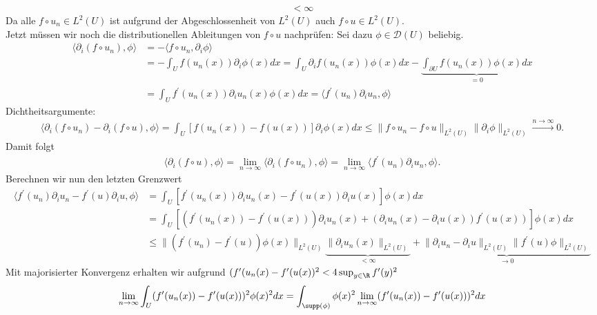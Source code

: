 \begin{solution}
\begin{align*}
  < \infty
\end{align*}
Da alle $f\circ u_n \in L^2(U)$ ist aufgrund der Abgeschlossenheit von $L^2(U)$
auch $f\circ u \in L^2(U)$. \\
Jetzt müssen wir noch die distributionellen Ableitungen von $f\circ u$ nachprüfen:
Sei dazu $\phi \in \mathcal{D}(U)$ beliebig.
\begin{align*}
  \langle \partial_i(f\circ u_n), \phi \rangle &= - \langle f\circ u_n, \partial_i \phi \rangle \\
  &= -\int_U f(u_n(x)) \partial_i\phi(x) dx = \int_U \partial_i f(u_n(x)) \phi(x) dx
  - \underbrace{\int_{\partial U} f(u_n(x))\phi(x) dx}_{=0} \\
  &= \int_U f^\prime(u_n(x)) \partial_i u_n(x) \phi(x) dx
  = \langle f^{\prime}(u_n)\partial_i u_n, \phi \rangle
\end{align*}
Dichtheitsargumente:
\begin{align*}
  \langle \partial_i(f\circ u_n) - \partial_i(f\circ u), \phi \rangle
  = \int_U[f(u_n(x)) - f(u(x))]\partial_i\phi(x) dx \leq
  \|f\circ u_n - f\circ u\|_{L^2(U)}\|\partial_i \phi\|_{L^2(U)} \xrightarrow{n \to \infty} 0.
\end{align*}
Damit folgt
\begin{align*}
  \langle \partial_i (f \circ u), \phi \rangle
  = \lim_{n \to \infty}\langle \partial_i (f \circ u_n), \phi \rangle
  = \lim_{n \to \infty}\langle f^{\prime}(u_n)\partial_i u_n, \phi \rangle.
\end{align*}
Berechnen wir nun den letzten Grenzwert
\begin{align*}
  \langle f^{\prime}(u_n)\partial_i u_n - f^{\prime}(u)\partial_i u, \phi \rangle &=
  \int_U [f^{\prime}(u_n(x))\partial_i u_n(x) - f^{\prime}(u(x))\partial_i u(x)] \phi(x) dx \\
  &= \int_U [(f^{\prime}(u_n(x)) -f^{\prime}(u(x)))\partial_i u_n(x)
  + (\partial_i u_n(x) - \partial_i u(x))f^{\prime}(u(x))]\phi(x) dx \\
  &\leq \|(f^{\prime}(u_n) - f^{\prime}(u))\phi(x)\|_{L^2(U)}
  \underbrace{\|\partial_i u_n(x)\|_{L^2(U)}}_{< \infty}
   + \underbrace{\|\partial_i u_n - \partial_i u\|_{L^2(U)}\|f^{\prime}(u)\phi\|_{L^2(U)}}_{\to 0}
\end{align*}
Mit majorisierter Konvergenz erhalten wir aufgrund
$(f^{\prime}(u_n(x) - f^{\prime}(u(x))^2 < 4\sup_{y \in \R}f^{\prime}(y)^2$
\begin{align*}
  \lim_{n \to \infty}\int_U (f^{\prime}(u_n(x)) - f^{\prime}(u(x)))^2\phi(x)^2 dx
  &= \int_{\supp(\phi)} \phi(x)^2\lim_{n \to \infty}(f^{\prime}(u_n(x)) - f^{\prime}(u(x)))^2 dx \\

\end{align*}
\end{solution}
